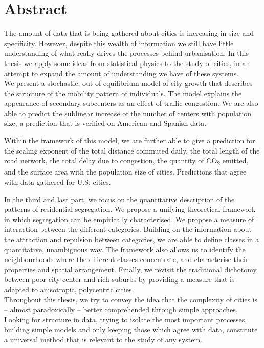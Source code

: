 

\begingroup
\let\clearpage\relax
\let\cleardoublepage\relax
\let\cleardoublepage\relax

\chapter*{Abstract} %


The amount of data that is being gathered about cities is increasing in size and
specificity. However, despite this wealth of information we still have little
understanding of what really drives the processes behind urbanisation. In this
thesis we apply some ideas from statistical physics to the study of cities, in
an attempt to expand the amount of understanding we have of these systems.\\ 



We present a stochastic, out-of-equilibrium model of city growth that describes
the structure of the mobility pattern of individuals. The model explains the
appearance of secondary subcenters as an effect of traffic congestion. We are
also able to predict the sublinear increase of the number of centers with
population size, a prediction that is verified on American and Spanish data. 

Within the framework of this model, we are further able to give a prediction for the
scaling exponent of the total distance commuted daily, the total length of the
road network, the total delay due to congestion, the quantity of
CO\textsubscript{2} emitted, and the surface area with the population size of
cities. Predictions that agree with data gathered for U.S. cities.

In the third and last part, we focus on the quantitative description of the
patterns of residential segregation. We propose a unifying theoretical framework
in which segregation can be empirically characterised. We propose a measure of
interaction between the different categories. Building on the information about
the attraction and repulsion between categories, we are able to define classes
in a quantitative, unambiguous way. The framework also allows us to identify the
neighbourhoods where the different classes concentrate, and characterise their
properties and spatial arrangement. Finally, we revisit the traditional
dichotomy between poor city center and rich suburbs by providing a measure that
is adapted to anisotropic, polycentric cities.\\


Throughout this thesis, we try to convey the idea that the complexity of cities is --
almost paradoxically -- better comprehended through simple approaches. 
Looking for structure in data, trying to isolate the most important processes,
building simple models and only keeping those which agree with data, constitute
a universal method that is relevant to the study of any system.


\endgroup			

\vfill
